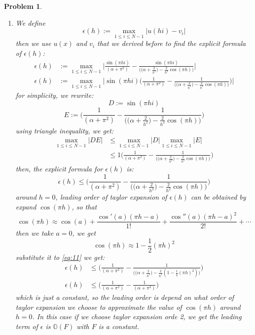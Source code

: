 \documentclass[a4paper,12pt]{article}
\newtheorem{prob}{Problem}[]
\begin{document}
\begin{prob}
\begin{enumerate}[label=(\alph*)]
		\item We define $$\epsilon(h) := \max_{1\leq i \leq N-1} |u(hi) - v_i|$$
		then we use $u(x)$ and $v_i$ that we derived before to find the explicit formula of $\epsilon(h)$:
		\begin{equation*}
		\begin{aligned}
		\epsilon(h) &:= \max_{1\leq i \leq N-1} \Biggr|\frac{\sin(\pi hi)}{(\alpha + \pi^2)} - \frac{\sin (\pi h i)}{\bigg( \bigg(\alpha + \frac{2}{h^2}\bigg) - \frac{2}{h^2} \cos (\pi h) \bigg)}\Biggr|\\
		\epsilon(h) &:= \max_{1\leq i \leq N-1} \Biggr|\sin(\pi hi) \Bigg( \frac{1}{(\alpha + \pi^2)} - \frac{1}{\bigg( \bigg(\alpha + \frac{2}{h^2}\bigg) - \frac{2}{h^2} \cos (\pi h) \bigg)} \Bigg) \Biggr|
		\end{aligned}
		\end{equation*}
		for simplicity, we rewrite:
		$$D :=\sin(\pi hi)$$
		$$E := \Bigg( \frac{1}{(\alpha + \pi^2)} - \frac{1}{\bigg( \bigg(\alpha + \frac{2}{h^2}\bigg) - \frac{2}{h^2} \cos (\pi h) \bigg)} \Bigg)$$
		using triangle inequality, we get:
		\begin{equation*}
		\begin{aligned}
		\max_{1\leq i \leq N-1} \bigr|DE\bigr| &\leq \max_{1\leq i \leq N-1} \bigr|D\bigr| \max_{1\leq i \leq N-1} \bigr|E\bigr|\\
		& \leq 1 \Bigg( \frac{1}{(\alpha + \pi^2)} - \frac{1}{\bigg( \bigg(\alpha + \frac{2}{h^2}\bigg) - \frac{2}{h^2} \cos (\pi h) \bigg)} \Bigg)
		\end{aligned}
		\end{equation*}
		then, the explicit formula for $\epsilon (h)$ is:
		\begin{equation}\label{eq:11}
		\epsilon(h) \leq \Bigg( \frac{1}{(\alpha + \pi^2)} - \frac{1}{\bigg( \bigg(\alpha + \frac{2}{h^2}\bigg) - \frac{2}{h^2} \cos (\pi h) \bigg)} \Bigg)
		\end{equation}
		around $h=0$, leading order of taylor expansion of $\epsilon (h)$ can be obtained by expand $\cos(\pi h)$, so that
		$$\cos(\pi h) \approx \cos(a) + \frac{\cos'(a)(\pi h - a)}{1!} + \frac{\cos''(a)(\pi h - a)^2}{2!} + \cdots$$
		then we take $a=0$, we get
		$$\cos(\pi h) \approx 1-\frac{1}{2}(\pi h)^2$$
		substitute it to \eqref{eq:11} we get:
		\begin{equation*}
		\begin{aligned}
		\epsilon(h) &\leq \Bigg( \frac{1}{(\alpha + \pi^2)} - \frac{1}{\bigg( \bigg(\alpha + \frac{2}{h^2}\bigg) - \frac{2}{h^2} (1-\frac{1}{2}(\pi h)^2) \bigg)} \Bigg)\\
		\epsilon(h) &\leq \Bigg( \frac{1}{(\alpha + \pi^2)} - \frac{1}{(\alpha + \pi^2)} \Bigg)
		\end{aligned}
		\end{equation*}
		which is just a constant, so the leading order is depend on what order of taylor expansion we choose to approximate the value of $\cos(\pi h)$ around $h=0$. In this case if we choose taylor expansion orde 2, we get the leading term of $\epsilon$ is $\mathbb{O}(F)$ with $F$ is a constant.
	\end{enumerate}
\end{prob}
\end{document}
